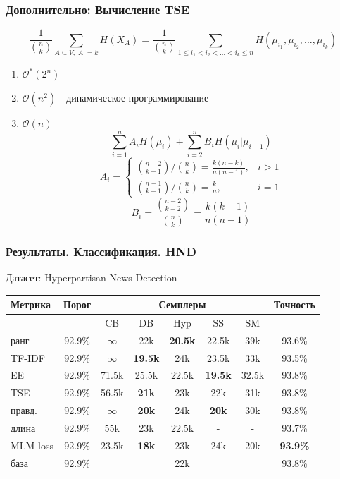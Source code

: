\documentclass{beamer}
\begin{document}
\begin{frame}[label=supplemental,noframenumbering]
	\frametitle{Дополнительно: Вычисление TSE}
	\[
	\frac{1}{\binom{n}{k}}\sum\limits_{A\subseteq V,|A|=k}H(X_A) =
	\frac{1}{\binom{n}{k}}\sum\limits_{1 \le i_1 < i_2 < \ldots < i_k \le n}H(\mu_{i_1}, \mu_{i_2}, \ldots, \mu_{i_k})
	\]
	\begin{enumerate}
		\item $\mathcal{O^*}(2^n)$
		\item $\mathcal{O}(n^2)$ - динамическое программирование
		\item $\mathcal{O}(n)$
		\[
		\sum\limits_{i=1}^{n}A_iH(\mu_i) + \sum\limits_{i=2}^{n}B_iH(\mu_i|\mu_{i-1})
		\]
		\[
		A_i = 
		\begin{cases}
		\binom{n-2}{k-1}/\binom{n}{k}=\frac{k(n-k)}{n(n-1)},& i > 1 \\
		\binom{n-1}{k-1}/\binom{n}{k}=\frac k n,& i = 1
		\end{cases}
		\]
		\[
		B_i = \frac{\binom{n-2}{k-2}}{\binom{n}{k}} = \frac{k(k-1)}{n(n-1)}
		\]
	\end{enumerate}
\end{frame}

\begin{frame}[label=supplemental,noframenumbering]
	\frametitle{Результаты. Классификация. HND}
	\let\thefootnote\relax{}
	
	Датасет: Hyperpartisan News Detection
	
	\begin{table}
		\begin{tabular}{|l|c|ccccc|c|}
			\hline
			Метрика & Порог & & \multicolumn{3}{c}{Семплеры} & & Точность \\
			\hline
			 & & CB & DB & Hyp & SS & SM &\\
			\hline
			ранг & 92.9\%  & $\infty$ & 22k & {\bf 20.5k} & 22.5k & 39k & 93.6\% \\
			TF-IDF & 92.9\%  & $\infty$ & {\bf 19.5k} & 24k & 23.5k & 33k & 93.5\% \\
			EE & 92.9\%  & 71.5k & 25.5k & 22.5k & {\bf 19.5k} & 32.5k & 93.8\% \\
			TSE & 92.9\% & 56.5k & {\bf 21k} & 23k & 22k & 31k & 93.8\% \\
			правд. & 92.9\%  & $\infty$ & {\bf 20k} & 24k & {\bf 20k} & 30k & 93.8\% \\
			длина & 92.9\% & 55k & 23k & 22.5k & - & - & 93.7\% \\
			MLM-loss & 92.9\% & 23.5k & {\bf 18k} & 23k & 24k & 20k & {\bf 93.9\%} \\
			\hline
			база & 92.9\%  & & \multicolumn{3}{c}{22k} & & 93.8\% \\
			\hline
		\end{tabular}
	\end{table}
\end{frame}
\end{document}
